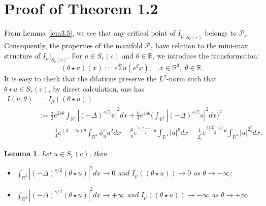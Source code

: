 \documentclass[11pt]{article}
\numberwithin{equation}{section}
\newtheorem{lemma}[theorem]{Lemma}
\begin{document}
\section{Proof of Theorem 1.2}

From Lemma \ref{lem3.5}, we see that any critical point of $I_\mu|_{S_r(c)}$ belongs 
to $\mathcal{P}_c$. Consequently, the properties of the manifold $\mathcal{P}_c$ have  
relation to the mini-max structure of $I_\mu|_{ S_{r}(c)}$. For $u\in  S_{r}(c)$ and 
$\theta\in \mathbb{R}$, we introduce the transformation:
\[ %
(\theta \star u)(x):=e^{\frac{3\theta}{2}}u(e^\theta x), \quad
x\in \mathbb{R}^3,\;\theta \in \mathbb{R}.
\]
It is easy to check that the dilations preserve the $L^2$-norm such that
$\theta \star u\in  S_{r}(c)$, by direct calculation, one has
\begin{align*}%
I(u,\theta)
&= I_\mu((\theta \star u))\\
&:= \frac{a}{2}e^{2s\theta}\int_{\mathbb{R}^3}|(-\Delta)^{s/2}u|^2dx
+\frac{b}{4}e^{4s\theta}\Big(\int_{\mathbb{R}^3}|(-\Delta)^{s/2}u|^2dx\Big)^2\\
&\quad +\frac{1}{4}e^{(3-2s)\theta}\int_{\mathbb{R}^3}\phi^s_u u^2dx-\frac{\mu}{p}e^{\frac{3(p-2)}{2}\theta}\int_{\mathbb{R}^3}|u|^pdx-
\frac{1}{2^*_s}e^{\frac{3(2^*_s-2)}{2}\theta}\int_{\mathbb{R}^3}|u|^{2^*_s}dx.
\end{align*}

\begin{lemma}\label{lem5.1}
Let $u\in  S_{r}(c)$, then
\begin{itemize}
\item[(i)] $\int_{\mathbb{R}^3}|(-\Delta)^{s/2}(\theta \star u)|^2dx\to 0$ and 
$I_\mu((\theta \star u))\to 0$ as $\theta \to -\infty$;

\item[(ii)] $\int_{\mathbb{R}^3}|(-\Delta)^{s/2}(\theta \star u)|^2dx\to +\infty$ and 
$I_\mu((\theta \star u))\to -\infty$ as $\theta \to +\infty$.
\end{itemize}
\end{lemma}
\end{document}
